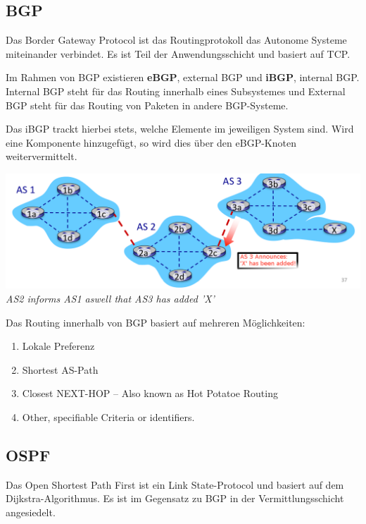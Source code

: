 \documentclass{article}
\begin{document}
    
    \subsection{BGP}
    Das Border Gateway Protocol ist das Routingprotokoll das Autonome Systeme miteinander verbindet. Es ist Teil der Anwendungsschicht und basiert auf TCP.
    
    Im Rahmen von BGP existieren \textbf{eBGP}, external BGP und \textbf{iBGP}, internal BGP. Internal BGP steht für das Routing innerhalb eines Subsystemes und External BGP steht für das Routing von Paketen in andere BGP-Systeme.
    
    Das iBGP trackt hierbei stets, welche Elemente im jeweiligen System sind. Wird eine Komponente hinzugefügt, so wird dies über den eBGP-Knoten weitervermittelt.
    
    \begin{center}
        \includegraphics[width=\textwidth]{BGP.png}
        \textit{AS2 informs AS1 aswell that AS3 has added 'X'}
    \end{center}
    
    Das Routing innerhalb von BGP basiert auf mehreren Möglichkeiten:
    \begin{enumerate}
        \item Lokale Preferenz
        \item Shortest AS-Path
        \item Closest NEXT-HOP -- Also known as Hot Potatoe Routing
        \item Other, specifiable Criteria or identifiers.
    \end{enumerate}
    
    
    \subsection{OSPF}
    Das Open Shortest Path First ist ein Link State-Protocol und basiert auf dem Dijkstra-Algorithmus. Es ist im Gegensatz zu BGP in der Vermittlungsschicht angesiedelt.
    
\end{document}
